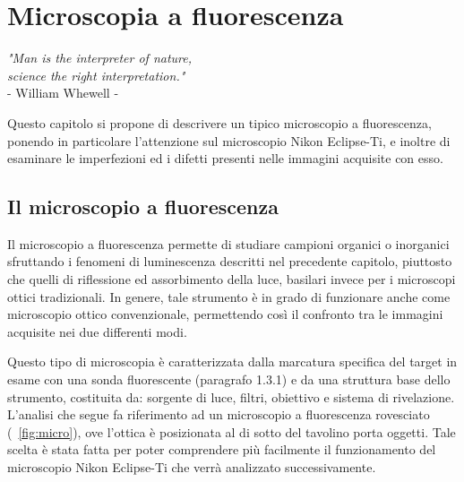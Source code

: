 \clearpage{\pagestyle{empty}\cleardoublepage}

\chapter{Microscopia a fluorescenza}

\begin{flushright}\begin{small}\textit{"Man is the interpreter of nature,\\ 
science the right interpretation."}\\
- William Whewell -\\
\end{small}\end{flushright}

Questo capitolo si propone di descrivere un tipico microscopio a fluorescenza, ponendo in particolare l'attenzione sul microscopio Nikon Eclipse-Ti, e inoltre di esaminare le imperfezioni ed i difetti presenti nelle immagini acquisite con esso.

\section {Il microscopio a fluorescenza}

Il microscopio a fluorescenza permette di studiare campioni organici o inorganici sfruttando i fenomeni di luminescenza descritti nel precedente capitolo, piuttosto che quelli di riflessione ed assorbimento della luce, basilari invece per i microscopi ottici tradizionali. 
In genere, tale strumento è in grado di funzionare anche come microscopio ottico convenzionale, permettendo così il confronto tra le immagini acquisite nei due differenti modi.

Questo tipo di microscopia è caratterizzata dalla marcatura specifica del target in esame con una sonda fluorescente (paragrafo 1.3.1) e da una struttura base dello strumento, costituita da: sorgente di luce, filtri, obiettivo e sistema di rivelazione. 
L'analisi che segue fa riferimento ad un microscopio a fluorescenza rovesciato (\figurename~\ref{fig:micro}), ove l'ottica è posizionata al di sotto del tavolino porta oggetti. 
Tale scelta è stata fatta per poter comprendere più facilmente il funzionamento del microscopio Nikon Eclipse-Ti che verrà analizzato successivamente.


